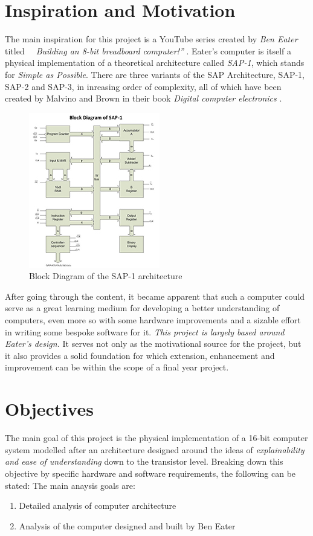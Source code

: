 \documentclass[11pt]{informatics-report}
\begin{document}
\section{Inspiration and Motivation}
The main inspiration for this project is a YouTube series created by \emph{Ben Eater} titled \emph{~~Building an 8-bit breadboard computer!''} \cite{eater2019breadboard}. Eater's computer is itself a physical implementation of a theoretical
architecture called \emph{SAP-1}, which stands for \emph{Simple as Possible}. There are three variants of the SAP Architecture, SAP-1, SAP-2 and SAP-3, in inreasing order of complexity, all of which have been created by Malvino and Brown in their book \emph{Digital computer electronics} \cite{malvino1992digital}.
\begin{figure}[ht]
  \centering
  \includegraphics{sap1}
  \caption{Block Diagram of the SAP-1 architecture}
  \label{sap1}
\end{figure}
\linebreak
After going through the content, it became apparent that such a computer could serve as a great learning medium for developing a better understanding of computers, even more so with some hardware improvements and a sizable effort in writing some bespoke software for it. \emph{This project is largely based around Eater's design.} It serves not only as the motivational source for the project, but it also provides a solid foundation for which extension, enhancement and improvement can be within the scope of a final year project.

\section{Objectives}
The main goal of this project is the physical implementation of a 16-bit computer system modelled after an architecture designed around the ideas of \emph{explainability and ease of understanding} down to the transistor level. Breaking down this objective by specific hardware and software requirements, the following can be stated:
The main anaysis goals are:
\begin{enumerate}
  \item Detailed analysis of computer architecture
  \item Analysis of the computer designed and built by Ben Eater \cite{eater2019breadboard}
\end{enumerate}
\end{document}
